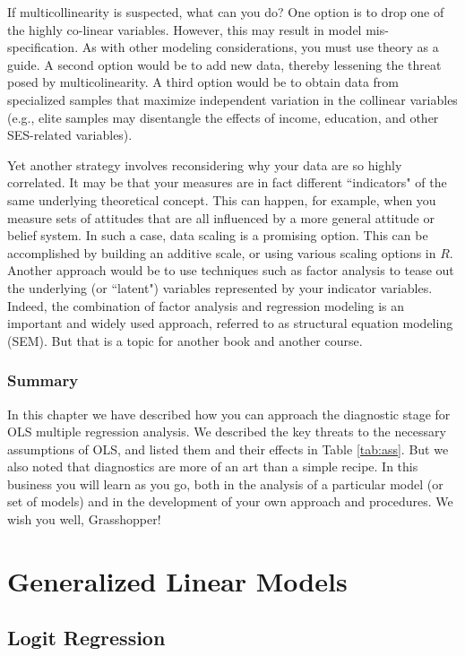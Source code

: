 \documentclass[11pt,openany]{book}\usepackage[]{graphicx}\usepackage[]{color}
\begin{document}
If multicollinearity is suspected, what can you do? One option is to drop one of the highly co-linear variables. However, this may result in model mis-specification. As with other modeling considerations, you must use theory as a guide. A second option would be to add new data, thereby lessening the threat posed by multicolinearity. A third option would be to obtain data from specialized  samples that maximize independent variation in the collinear variables (e.g., elite samples may disentangle the effects of income, education, and other SES-related variables). 

Yet another strategy involves reconsidering why your data are so highly  correlated. It may be that your measures are in fact different ``indicators" of the same underlying theoretical concept. This can happen, for example, when you measure sets of attitudes that are all influenced by a more general attitude or belief system. In such a case, data scaling is a promising option. This can be accomplished by building an additive scale, or using various scaling options in $R$. Another approach would be to use techniques such as factor analysis to tease out the underlying (or ``latent") variables represented by your indicator variables. Indeed, the combination of factor analysis and regression modeling is an important and widely used approach, referred to as structural equation modeling (SEM).  But that is a topic for another book and another course.

\section{Summary}
In this chapter we have described how you can approach the diagnostic stage for OLS multiple regression analysis. We described the key threats to the necessary assumptions of OLS, and listed them and their effects in Table \ref{tab:ass}. But we also noted that diagnostics are more of an art than a simple recipe. In this business you will learn as you go, both in the analysis of a particular model (or set of models) and in the development of  your own approach and procedures. We wish you well, Grasshopper!

\part{Generalized Linear Models}





\chapter{Logit Regression} 
\end{document}
